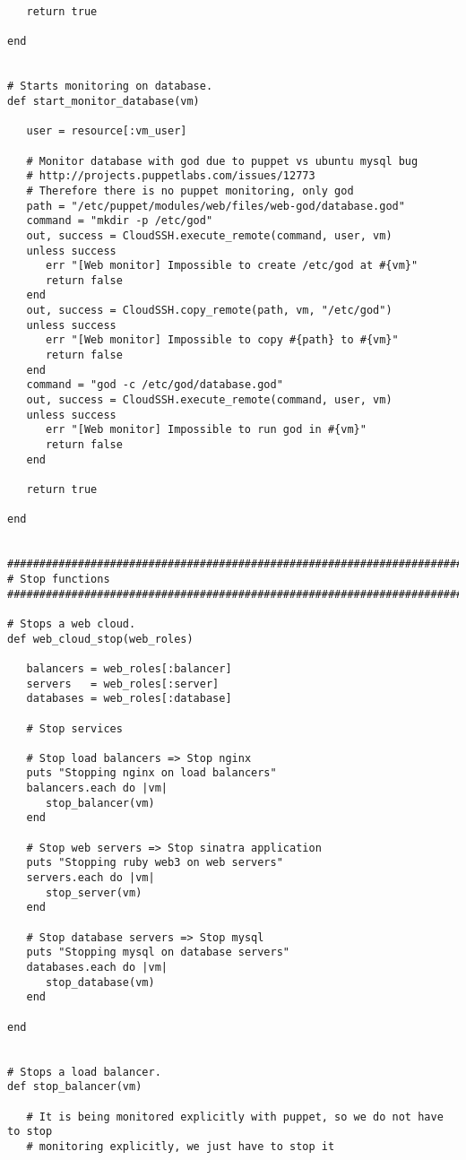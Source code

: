 \begin{lstlisting}
   return true

end


# Starts monitoring on database.
def start_monitor_database(vm)

   user = resource[:vm_user]

   # Monitor database with god due to puppet vs ubuntu mysql bug
   # http://projects.puppetlabs.com/issues/12773
   # Therefore there is no puppet monitoring, only god
   path = "/etc/puppet/modules/web/files/web-god/database.god"
   command = "mkdir -p /etc/god"
   out, success = CloudSSH.execute_remote(command, user, vm)
   unless success
      err "[Web monitor] Impossible to create /etc/god at #{vm}"
      return false
   end
   out, success = CloudSSH.copy_remote(path, vm, "/etc/god")
   unless success
      err "[Web monitor] Impossible to copy #{path} to #{vm}"
      return false
   end
   command = "god -c /etc/god/database.god"
   out, success = CloudSSH.execute_remote(command, user, vm)
   unless success
      err "[Web monitor] Impossible to run god in #{vm}"
      return false
   end
   
   return true

end


################################################################################
# Stop functions
################################################################################

# Stops a web cloud.
def web_cloud_stop(web_roles)

   balancers = web_roles[:balancer]
   servers   = web_roles[:server]
   databases = web_roles[:database]

   # Stop services
   
   # Stop load balancers => Stop nginx
   puts "Stopping nginx on load balancers"
   balancers.each do |vm|
      stop_balancer(vm)
   end
   
   # Stop web servers => Stop sinatra application
   puts "Stopping ruby web3 on web servers"
   servers.each do |vm|
      stop_server(vm)
   end
   
   # Stop database servers => Stop mysql
   puts "Stopping mysql on database servers"
   databases.each do |vm|
      stop_database(vm)
   end

end


# Stops a load balancer.
def stop_balancer(vm)

   # It is being monitored explicitly with puppet, so we do not have to stop
   # monitoring explicitly, we just have to stop it
   

\end{lstlisting}
